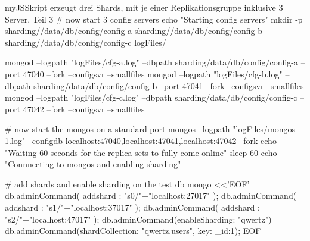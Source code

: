 \begin{listingsboxJavaScript}[label={lst:createShards3}]{myJS}{Skript erzeugt drei Shards, mit je einer Replikationsgruppe inklusive 3 Server, Teil 3}
# now start 3 config servers
echo "Starting config servers"
mkdir -p sharding//data/db/config/config-a sharding//data/db/config/config-b 
sharding//data/db/config/config-c logFiles/

mongod --logpath "logFiles/cfg-a.log" --dbpath sharding/data/db/config/config-a
 --port 47040 --fork --configsvr --smallfiles
mongod --logpath "logFiles/cfg-b.log" --dbpath sharding/data/db/config/config-b 
--port 47041 --fork --configsvr --smallfiles
mongod --logpath "logFiles/cfg-c.log" --dbpath sharding/data/db/config/config-c 
--port 47042 --fork --configsvr --smallfiles

# now start the mongos on a standard port
mongos --logpath "logFiles/mongos-1.log" 
--configdb localhost:47040,localhost:47041,localhost:47042 --fork
echo "Waiting 60 seconds for the replica sets to fully come online"
sleep 60
echo "Connnecting to mongos and enabling sharding"

# add shards and enable sharding on the test db
mongo <<'EOF'
db.adminCommand( { addshard : "s0/"+"localhost:27017" } );
db.adminCommand( { addshard : "s1/"+"localhost:37017" } );
db.adminCommand( { addshard : "s2/"+"localhost:47017" } );
db.adminCommand({enableSharding: "qwertz"})
db.adminCommand({shardCollection: "qwertz.users", key: {_id:1}});
EOF
\end{listingsboxJavaScript}


